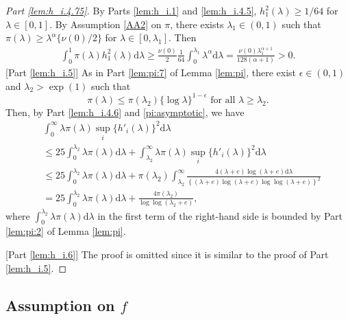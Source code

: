 \documentclass[preprint,11pt]{imsart}
\numberwithin{equation}{section}
\theoremstyle{plain}
\theoremstyle{definition}
\theoremstyle{remark}
\newcommand{\rd}{\mathrm{d}}
\begin{document}
\begin{proof}
 [Part \ref{lem:h_i.4.75}]
 By Parts \ref{lem:h_i.1} and \ref{lem:h_i.4.5},
 $h^2_1(\lambda)\geq 1/64$ for $\lambda\in[0,1]$.
 By Assumption \ref{AA2} on $\pi$, there exists $\lambda_1\in(0,1)$
 such that $ \pi(\lambda) \geq \lambda^{\alpha}\{\nu(0)/2\}$ for $\lambda\in[0,\lambda_1]$.
 Then
 \begin{align*}
  \int_0^1 \pi(\lambda)h^2_1(\lambda)\rd \lambda \geq 
  \frac{\nu(0)}{2}\frac{1}{64}\int_0^{\lambda_1} \lambda^{\alpha}\rd \lambda 
=  \frac{\nu(0)\lambda_1^{\alpha+1}}{128(\alpha+1)} >0.
 \end{align*}
 [Part \ref{lem:h_i.5}] 
 As in Part \ref{lem:pi:7} of Lemma \ref{lem:pi}, there exist $\epsilon\in(0,1)$ and $\lambda_2>\exp(1)$ such that
 \begin{equation}\label{pi:asymptotic}
\pi(\lambda)\leq \pi(\lambda_2)\{\log \lambda\}^{1-\epsilon}\text{ for all }\lambda\geq \lambda_2.
 \end{equation}
 Then, by Part \ref{lem:h_i.4.6} and \eqref{pi:asymptotic}, we have
 \begin{align*}
&\int_0^\infty \lambda\pi(\lambda)\sup_i \{h'_i(\lambda)\}^2 \rd \lambda   \\
  &\leq
  25
  \int_0^{\lambda_2} \lambda  \pi(\lambda)  \rd  \lambda 
  +  \int_{\lambda_2}^\infty \lambda \pi(\lambda)\sup_i\{h'_i(\lambda)\}^2   \rd  \lambda \\
  &\leq 25  \int_0^{\lambda_2} \lambda  \pi(\lambda)  \rd  \lambda
  +  \pi(\lambda_2)\int_{\lambda_2}^\infty
 \frac{4 (\lambda+e)\log (\lambda+e)\rd  \lambda}{\left\{(\lambda+e)\log (\lambda+e)\log\log (\lambda+e)\right\}^2}    \\ 
  &=
  25
  \int_0^{\lambda_2} \lambda  \pi(\lambda)  \rd  \lambda 
  +  \frac{4\pi(\lambda_2)}{\log\log(\lambda_2+e)},
 \end{align*}
 where
$\int_0^{\lambda_2} \lambda  \pi(\lambda)\rd  \lambda $ in the first term of the right-hand side 
is bounded  by Part \ref{lem:pi:2} of Lemma \ref{lem:pi}.

 [Part \ref{lem:h_i.6}] The proof is omitted since it is similar to the proof of Part \ref{lem:h_i.5}.
\end{proof}

\subsection{Assumption on $f$}
 
\end{document}
